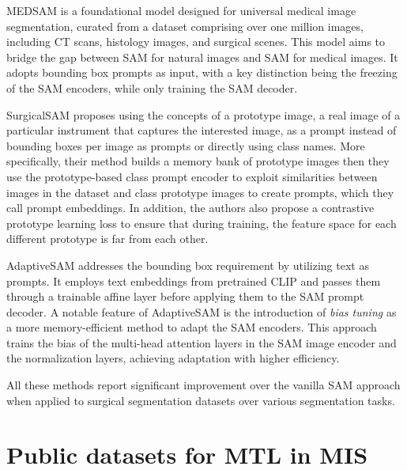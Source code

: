 \documentclass[times,twocolumn,final]{elsarticle}
\begin{document}
MEDSAM \citep{ma2023segment} is a foundational model designed for universal medical image segmentation, curated from a dataset comprising over one million images, including CT scans, histology images, and surgical scenes. This model aims to bridge the gap between SAM for natural images and SAM for medical images. It adopts bounding box prompts as input, with a key distinction being the freezing of the SAM encoders, while only training the SAM decoder.


SurgicalSAM \citep{yue2023surgicalsam} proposes using the concepts of a prototype image, a real image of a particular instrument that captures the interested image, as a prompt instead of bounding boxes per image as prompts or directly using class names. More specifically, their method builds a memory bank of prototype images then they use the prototype-based class prompt encoder to exploit similarities between images in the dataset and class prototype images to create prompts, which they call prompt embeddings. In addition, the authors also propose a contrastive prototype learning loss to ensure that during training, the feature space for each different prototype is far from each other. 

AdaptiveSAM \citep{paranjape2023adaptivesam} addresses the bounding box requirement by utilizing text as prompts. It employs text embeddings from pretrained CLIP and passes them through a trainable affine layer before applying them to the SAM prompt decoder. A notable feature of AdaptiveSAM is the introduction of \emph{bias tuning} as a more memory-efficient method to adapt the SAM encoders. This approach trains the bias of the multi-head attention layers in the SAM image encoder and the normalization layers, achieving adaptation with higher efficiency.

All these methods \citep{ma2023segment,yue2023surgicalsam,paranjape2023adaptivesam} report significant improvement over the vanilla SAM approach when applied to surgical segmentation datasets over various segmentation tasks.


\section{Public datasets for MTL in MIS} \label{sec::datasets}
\end{document}
